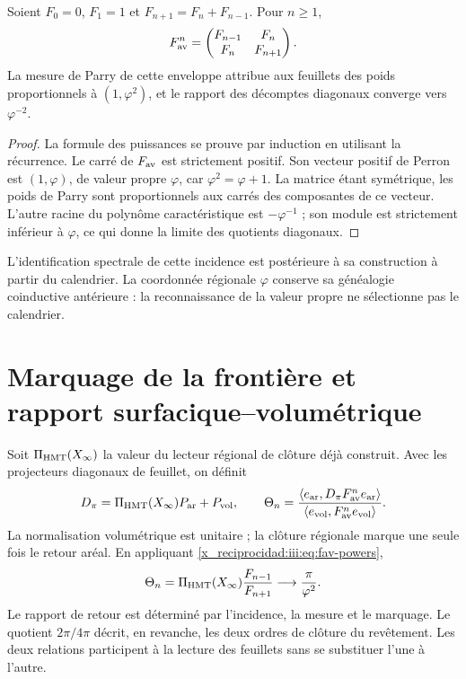 \begin{proposition}
Soient $F_0=0$, $F_1=1$ et $F_{n+1}=F_n+F_{n-1}$. Pour $n\geq1$,
\begin{equation}
 F_{\rm av}^{n}=
 \begin{pmatrix}F_{n-1}&F_n\\F_n&F_{n+1}\end{pmatrix}.
 \label{x_reciprocidad:iii:eq:fav-powers}
\end{equation}
La mesure de Parry de cette enveloppe attribue aux feuillets des poids proportionnels à $(1,\varphi^2)$, et le rapport des décomptes diagonaux converge vers $\varphi^{-2}$.
\end{proposition}
\begin{proof}
La formule des puissances se prouve par induction en utilisant la récurrence.
Le carré de $F_{\rm av}$ est strictement positif. Son vecteur positif de
Perron est $(1,\varphi)$, de valeur propre $\varphi$, car
$\varphi^2=\varphi+1$. La matrice étant symétrique, les poids de Parry sont
proportionnels aux carrés des composantes de ce vecteur. L’autre racine
du polynôme caractéristique est $-\varphi^{-1}$ ; son module est strictement
inférieur à $\varphi$, ce qui donne la limite des quotients diagonaux.
\end{proof}

L’identification spectrale de cette incidence est postérieure à sa construction
à partir du calendrier. La coordonnée régionale $\varphi$ conserve sa généalogie
coinductive antérieure : la reconnaissance de la valeur propre ne sélectionne pas le calendrier.

\section{Marquage de la frontière et rapport surfacique--volumétrique}

Soit $\Pi_{\rm HMT}(X_\infty)$ la valeur du lecteur régional de clôture déjà construit. Avec les projecteurs diagonaux de feuillet, on définit
\begin{equation}
 D_\pi=\Pi_{\rm HMT}(X_\infty)P_{\rm ar}+P_{\rm vol},\qquad
 \Theta_n=
 \frac{\langle e_{\rm ar},D_\pi F_{\rm av}^{n}e_{\rm ar}\rangle}
 {\langle e_{\rm vol},F_{\rm av}^{n}e_{\rm vol}\rangle}.
 \label{x_reciprocidad:iii:eq:marked-return}
\end{equation}
La normalisation volumétrique est unitaire ; la clôture régionale marque une seule fois
le retour aréal. En appliquant \eqref{x_reciprocidad:iii:eq:fav-powers},
\begin{equation}
 \Theta_n=\Pi_{\rm HMT}(X_\infty)\frac{F_{n-1}}{F_{n+1}}
 \longrightarrow\frac{\pi}{\varphi^2}.
 \label{x_reciprocidad:iii:eq:av-limit}
\end{equation}
Le rapport de retour est déterminé par l'incidence, la mesure et le marquage. Le quotient $2\pi/4\pi$ décrit, en revanche, les deux ordres de clôture du revêtement. Les deux relations participent à la lecture des feuillets sans se substituer l'une à l'autre.


